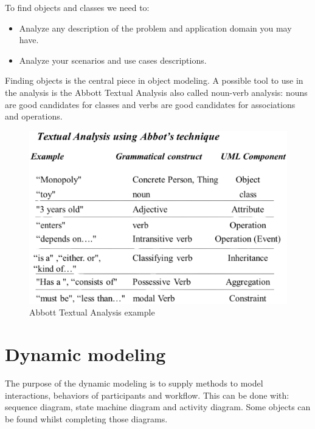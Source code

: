 \documentclass[12pt, a4paper]{report}
\begin{document}
    To find objects and classes we need to:
    \begin{itemize}
        \item Analyze any description of the problem and application domain you may have.
        \item Analyze your scenarios and use cases descriptions.
    \end{itemize}
    Finding objects is the central piece in object modeling. A possible tool to use in the analysis is the Abbott Textual Analysis also called noun-verb analysis: nouns are good 
    candidates for classes and verbs are good candidates for associations and operations. 
    \begin{figure}[H]
        \centering
        \includegraphics[width=0.5\linewidth]{images/Abbott.png}
        \caption{Abbott Textual Analysis example}
    \end{figure}
\section{Dynamic modeling}
    The purpose of the dynamic modeling is to supply methods to model interactions, behaviors of participants and workflow. This can be done with: sequence diagram, state machine 
    diagram and activity diagram. Some objects can be found whilst completing those diagrams.
     
\end{document}
